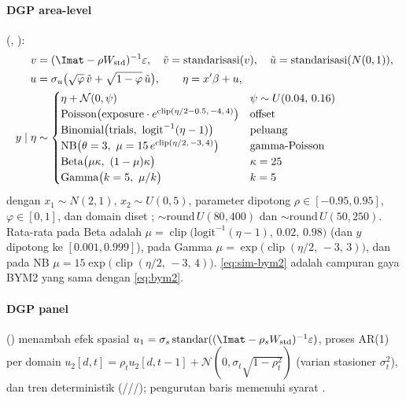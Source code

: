 \paragraph{DGP area-level} (, ):
\begin{align}
  v&=(\Imat-\rho W_{\text{std}})^{-1}\varepsilon,\quad
    \tilde v=\text{standarisasi}(v),\quad
    \tilde u=\text{standarisasi}(N(0,1)),\label{eq:sim-spatial}\\
  u&=\sigma_u\bigl(\sqrt{\varphi}\,\tilde v+\sqrt{1-\varphi}\,\tilde u\bigr),
    \qquad
    \eta=x'\beta+u, \label{eq:sim-bym2}\\
  y\mid\eta&\sim
    \begin{cases}
      \eta+\mathcal N(0,\psi) & \psi\sim U(0.04,\,0.16)\\
      \text{Poisson}\bigl(\text{exposure}\cdot
        e^{\operatorname{clip}(\eta/2-0.5,\,-4,\,4)}\bigr) & \text{offset}\\
      \text{Binomial}\bigl(\text{trials},\ \mathrm{logit}^{-1}(\eta-1)\bigr) & \text{peluang}\\
      \text{NB}\bigl(\theta=3,\ \mu=15\,e^{\operatorname{clip}(\eta/2,\,-3,\,4)}\bigr) &
        \text{gamma-Poisson}\\
      \text{Beta}\bigl(\mu\kappa,\ (1-\mu)\kappa\bigr) & \kappa=25\\
      \text{Gamma}\bigl(k=5,\ \mu/k\bigr) & k=5
    \end{cases}
    \label{eq:sim-resp}
\end{align}
dengan $x_1\sim N(2,1)$, $x_2\sim U(0,5)$, parameter dipotong
$\rho\in[-0.95,0.95]$, $\varphi\in[0,1]$, dan  domain
diset ;  $\sim\mathrm{round}\,U(80,400)$ dan
 $\sim\mathrm{round}\,U(50,250)$. Rata-rata pada Beta adalah
$\mu=\operatorname{clip}\bigl(\mathrm{logit}^{-1}(\eta-1),\,0.02,\,0.98\bigr)$
(dan $y$ dipotong ke $[0.001,0.999]$), pada Gamma
$\mu=\exp\bigl(\operatorname{clip}(\eta/2,\,-3,\,3)\bigr)$, dan pada NB
$\mu=15\exp\bigl(\operatorname{clip}(\eta/2,\,-3,\,4)\bigr)$. \eqref{eq:sim-bym2} adalah campuran gaya BYM2 yang sama
dengan \eqref{eq:bym2}.

\paragraph{DGP panel} () menambah efek spasial
$u_1=\sigma_s\,\text{standar}((\Imat-\rho_sW_{\text{std}})^{-1}\varepsilon)$,
proses AR(1) per domain $u_2[d,t]=\rho_t u_2[d,t-1]+\mathcal N(0,\sigma_t\sqrt{1-\rho_t^2})$
(varian stasioner $\sigma_t^2$), dan tren deterministik
(///); pengurutan baris
 memenuhi syarat .

